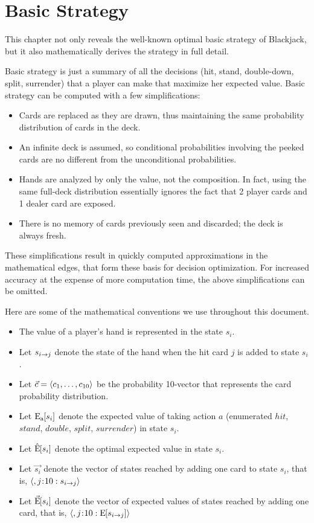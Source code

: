 
\chapter{Basic Strategy}
\label{sec:basic}

This chapter not only reveals the well-known optimal basic strategy
of Blackjack, but it also mathematically derives the strategy 
in full detail.  

Basic strategy is just a summary of all the decisions 
(hit, stand, double-down, split, surrender) that a player can 
make that maximize her expected value.  
Basic strategy can be computed with a few simplifications:
\begin{itemize}
\item Cards are replaced as they are drawn, thus maintaining the same
	probability distribution of cards in the deck.
\item An infinite deck is assumed, so conditional probabilities
	involving the peeked cards are no different from
	the unconditional probabilities.
\item Hands are analyzed by only the value, not the composition.
	In fact, using the same full-deck distribution essentially
	ignores the fact that 2 player cards and 1 dealer card
	are exposed.
\item There is no memory of cards previously seen and discarded; 
	the deck is always fresh.
\end{itemize}

\noindent
These simplifications result in quickly computed approximations in the
mathematical edges, that form these basis for decision optimization.  
For increased accuracy at the expense of more computation time,
the above simplifications can be omitted.

Here are some of the mathematical conventions we use
throughout this document.

\begin{itemize}
\item The value of a player's hand is represented in the state $s_i$.
\item Let $s_{i\rightarrow{}j}$ denote the state of the hand
when the hit card $j$ is added to state $s_i$.
\item Let $\vec{c}=\langle c_1, \ldots, c_{10}\rangle$ be the probability 10-vector
	that represents the card probability distribution.
\item Let $\textrm{E}_{\textrm{a}}\hspace{-.5ex}\left[s_i\right]$ denote the expected value of taking action
$a$ (enumerated $hit$, $stand$, $double$, $split$, $surrender$) in state $s_i$.
\item Let $\hat{\textrm{E}}\hspace{-.5ex}\left[s_i\right]$ denote the optimal expected value in state $s_i$.
\item Let $\Vec{s_i}$ denote the vector of states reached by adding 
	one card to state $s_i$, that is, $\langle,j\hspace{-.5ex}:\hspace{-.5ex}10 : s_{i\rightarrow{}j}\rangle$
\item Let $\vec{\textrm{E}}\hspace{-.5ex}\left[s_i\right]$ denote the vector of expected values of 
	states reached by adding one card, that is, 
	$\langle,j\hspace{-.5ex}:\hspace{-.5ex}10 : \textrm{E}\hspace{-.5ex}\left[s_{i\rightarrow{}j}\right]\rangle$
\end{itemize}

